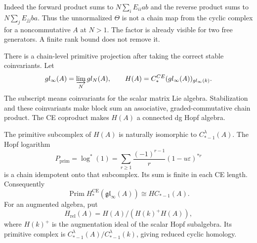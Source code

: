 Indeed the forward product sums to $N\sum_iE_{ii}ab$ and the
reverse product sums to $N\sum_jE_{jj}ba$. Thus the unnormalized
$\Theta$ is not a chain map from the cyclic complex for a
noncommutative $A$ at $N>1$. The factor is already visible for
two free generators. A finite rank bound does not remove it.

There is a chain-level primitive projection after taking the
correct stable coinvariants. Let
\[
 \mathfrak{gl}_\infty(A)=\varinjlim_N\mathfrak{gl}_N(A),\qquad
 H(A)=C_*^{\mathrm{CE}}(\mathfrak{gl}_\infty(A))_{
                                      \mathfrak{gl}_\infty(k)}.
\]
The subscript means coinvariants for the scalar matrix Lie
algebra. Stabilization and these coinvariants make block sum
an associative, graded-commutative chain product. The CE
coproduct makes $H(A)$ a connected dg Hopf algebra.

\begin{theorem}
\label{mht:thm:stable-cyclic-primitives}
The primitive subcomplex of $H(A)$ is naturally isomorphic to
$C^\lambda_{*-1}(A)$. The Hopf logarithm
\[
 P_{\mathrm{prim}}=\log^*(1)
 =\sum_{r\geq1}\frac{(-1)^{r-1}}r
                    (1-u\varepsilon)^{*r}
\]
is a chain idempotent onto that subcomplex. Its sum is finite
in each CE length. Consequently
\[
 \operatorname{Prim}H_*^{\mathrm{CE}}
                  (\mathfrak{gl}_\infty(A))\cong HC_{*-1}(A).
\]
For an augmented algebra, put
\[
 H_{\mathrm{rel}}(A)=H(A)/(H(k)^+H(A)),
\]
where $H(k)^+$ is the augmentation ideal of the scalar Hopf
subalgebra. Its primitive complex is
$C^\lambda_{*-1}(A)/C^\lambda_{*-1}(k)$, giving reduced cyclic
homology.
\end{theorem}

